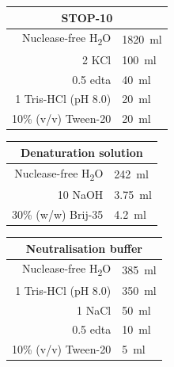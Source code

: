 \begin{appendix}
\begin{multicols}{2}

\begin{center}
\begin{tabular}{r|l}
	\multicolumn{2}{c}{STOP-10} \\
	\hline
	Nuclease-free H\textsubscript{2}O & \SI{1820}{\ml} \\
	\SI{2}{\molar} KCl & \SI{100}{\ml} \\
	\SI{0.5}{\molar} \acrshort{edta} & \SI{40}{\ml} \\
	\SI{1}{\molar} Tris-HCl (pH 8.0) & \SI{20}{\ml} \\
	10\% (v/v) Tween-20 & \SI{20}{\ml} \\
\end{tabular}
\end{center}
\medskip


\begin{center}
\begin{tabular}{r|l}
	\multicolumn{2}{c}{Denaturation solution} \\
	\hline
	Nuclease-free H\textsubscript{2}O & \SI{242}{\ml} \\
	\SI{10}{\molar} NaOH & \SI{3.75}{\ml} \\
	30\% (w/w) Brij-35 & \SI{4.2}{\ml} \\
\end{tabular}
\end{center}
\medskip


\begin{center}
\begin{tabular}{r|l}
	\multicolumn{2}{c}{Neutralisation buffer} \\
	\hline
	Nuclease-free H\textsubscript{2}O & \SI{385}{\ml} \\
	\SI{1}{\molar} Tris-HCl (pH 8.0) & \SI{350}{\ml} \\
	\SI{1}{\molar} NaCl & \SI{50}{\ml} \\
	\SI{0.5}{\molar} \acrshort{edta} & \SI{10}{\ml} \\
	10\% (v/v) Tween-20 & \SI{5}{\ml} \\
\end{tabular}
\end{center}
\medskip


\end{multicols}
\end{appendix}
